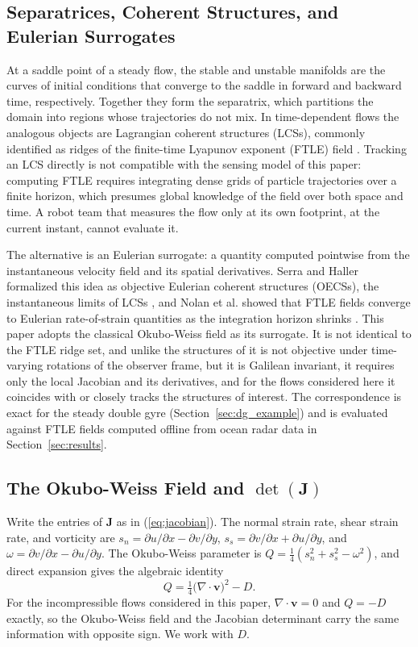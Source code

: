 \documentclass[lettersize,journal]{IEEEtran}
\begin{document}
\subsection{Separatrices, Coherent Structures, and Eulerian Surrogates}
\label{sec:separatrix}

At a saddle point of a steady flow, the stable and unstable manifolds are
the curves of initial conditions that converge to the saddle in forward
and backward time, respectively. Together they form the separatrix, which
partitions the domain into regions whose trajectories do not mix. In
time-dependent flows the analogous objects are Lagrangian coherent
structures (LCSs), commonly identified as ridges of the finite-time
Lyapunov exponent (FTLE) field \cite{6,7,8}. Tracking an LCS directly is not
compatible with the sensing model of this paper: computing FTLE requires
integrating dense grids of particle trajectories over a finite horizon,
which presumes global knowledge of the field over both space and time. A
robot team that measures the flow only at its own footprint, at the
current instant, cannot evaluate it.

The alternative is an Eulerian surrogate: a quantity computed pointwise
from the instantaneous velocity field and its spatial derivatives. Serra
and Haller formalized this idea as objective Eulerian coherent structures
(OECSs), the instantaneous limits of LCSs \cite{17}, and Nolan et al. showed
that FTLE fields converge to Eulerian rate-of-strain quantities as the
integration horizon shrinks \cite{18}. This paper adopts the classical
Okubo-Weiss field as its surrogate. It is not identical to the FTLE ridge
set, and unlike the structures of \cite{17} it is not objective under
time-varying rotations of the observer frame, but it is Galilean
invariant, it requires only the local Jacobian and its derivatives, and
for the flows considered here it coincides with or closely tracks the
structures of interest. The correspondence is exact for the steady double
gyre (Section~\ref{sec:dg_example}) and is evaluated against FTLE fields
computed offline from ocean radar data in Section~\ref{sec:results}.

\subsection{The Okubo-Weiss Field and $\det(\mathbf{J})$}

Write the entries of $\mathbf{J}$ as in (\ref{eq:jacobian}). The normal
strain rate, shear strain rate, and vorticity are
$s_n = \partial u/\partial x - \partial v/\partial y$,
$s_s = \partial v/\partial x + \partial u/\partial y$, and
$\omega = \partial v/\partial x - \partial u/\partial y$. The Okubo-Weiss
parameter \cite{21,22} is $Q = \tfrac{1}{4}(s_n^2 + s_s^2 - \omega^2)$, and
direct expansion gives the algebraic identity
\begin{equation}
    Q = \tfrac{1}{4}\bigl(\nabla \cdot \mathbf{v}\bigr)^2 - D.
    \label{eq:okubo_weiss}
\end{equation}
For the incompressible flows considered in this paper,
$\nabla \cdot \mathbf{v} = 0$ and $Q = -D$ exactly, so the Okubo-Weiss
field and the Jacobian determinant carry the same information with
opposite sign. We work with $D$.
\end{document}
